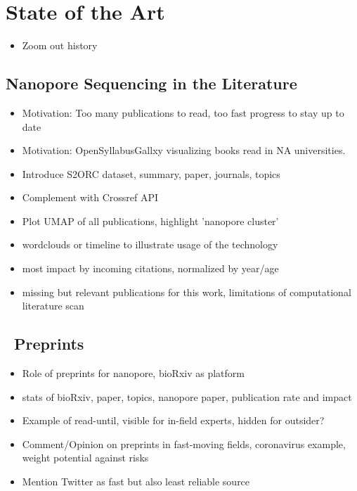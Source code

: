 \chapter{State of the Art}
\label{cha:state_of_art}

\begin{itemize}
    \item Zoom out history \cite{Deamer2016}
\end{itemize}

\section{Nanopore Sequencing in the Literature}
\label{sec:state_of_art:nanopore_literature}

\begin{itemize}
    \item Motivation: Too many publications to read, too fast progress to stay up to date
    \item Motivation: OpenSyllabusGallxy visualizing books read in NA universities.
    \item Introduce S2ORC dataset, summary, paper, journals, topics
    \item Complement with Crossref API
    \item Plot UMAP of all publications, highlight 'nanopore cluster'
    \item wordclouds or timeline to illustrate usage of the technology
    \item most impact by incoming citations, normalized by year/age
    \item missing but relevant publications for this work, limitations of computational literature scan
\end{itemize}

\section{\Biorxiv\ Preprints}
\label{sec:state_of_art:biorxiv}

\begin{itemize}
    \item Role of preprints for nanopore, bioRxiv as platform
    \item stats of bioRxiv, paper, topics, nanopore paper, publication rate and impact
    \item Example of read-until, visible for in-field experts, hidden for outsider?
    \item Comment/Opinion on preprints in fast-moving fields, coronavirus example, weight potential against risks
    \item Mention Twitter as fast but also least reliable source
\end{itemize}

